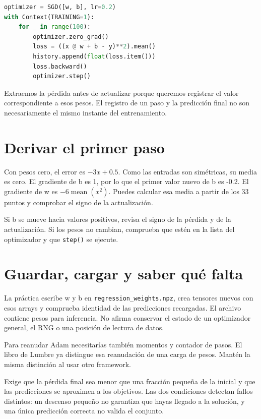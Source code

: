 \documentclass[12pt,a4paper,oneside]{report}
\begin{document}
\begin{lstlisting}[language=Python]
optimizer = SGD([w, b], lr=0.2)
with Context(TRAINING=1):
    for _ in range(100):
        optimizer.zero_grad()
        loss = ((x @ w + b - y)**2).mean()
        history.append(float(loss.item()))
        loss.backward()
        optimizer.step()
\end{lstlisting}
Extraemos la pérdida antes de actualizar porque queremos registrar el valor correspondiente a esos pesos. El registro de un paso y la predicción final no son necesariamente el mismo instante del entrenamiento.

\section{Derivar el primer paso}
Con pesos cero, el error es $-3x+0.5$. Como las entradas son simétricas, su media es cero. El gradiente de b es 1, por lo que el primer valor nuevo de b es -0.2. El gradiente de w es $-6\operatorname{mean}(x^2)$. Puedes calcular esa media a partir de los 33 puntos y comprobar el signo de la actualización.

Si b se mueve hacia valores positivos, revisa el signo de la pérdida y de la actualización. Si los pesos no cambian, comprueba que estén en la lista del optimizador y que \texttt{step()} se ejecute.

\section{Guardar, cargar y saber qué falta}
La práctica escribe w y b en \texttt{regression\_w\allowbreak{}eights.npz}, crea tensores nuevos con esos arrays y comprueba identidad de las predicciones recargadas. El archivo contiene pesos para inferencia. No afirma conservar el estado de un optimizador general, el RNG o una posición de lectura de datos.

Para reanudar Adam necesitarías también momentos y contador de pasos. El libro de Lumbre ya distingue esa reanudación de una carga de pesos. Mantén la misma distinción al usar otro framework.

\begin{practica}
Exige que la pérdida final sea menor que una fracción pequeña de la inicial y que las predicciones se aproximen a los objetivos. Las dos condiciones detectan fallos distintos: un descenso pequeño no garantiza que hayas llegado a la solución, y una única predicción correcta no valida el conjunto.

\end{practica}
\end{document}

